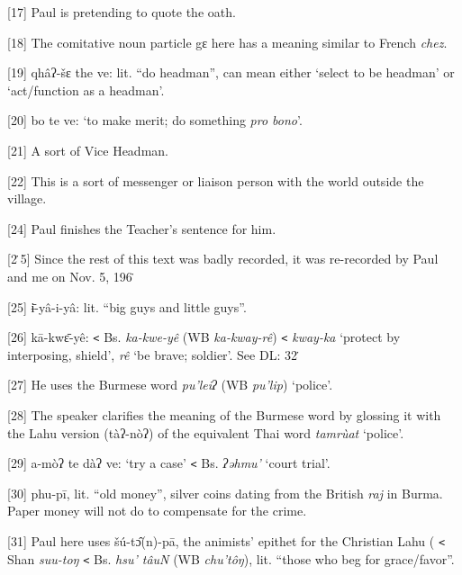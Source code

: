 {[17] Paul is pretending to quote the oath.}

{[18] The comitative noun particle gɛ here has a meaning similar to French
}{\textit{chez}}{.}

{[19] qhâʔ-šɛ the ve: lit. ``do headman'', can mean either `select to
be headman' or `act/function as a headman'. }

{[20] bo te ve: `to make merit; do something }{\textit{pro bono}}{'.}

{[21] A sort of Vice Headman.}

{[22] This is a sort of messenger or liaison person with the world outside
the village.}

{[24] Paul finishes the Teacher's sentence for him.}

{[2\.5] Since the rest of this text was badly recorded, it was re-recorded
by Paul and me on Nov. 5, 196\.}

{[25] ɨ̄-yâ-i-yâ: lit. ``big guys and little guys''.}

{[26] kā-kwɛ̄-yê: \texttt{<} Bs. }{\textit{ka-kwe-yê }}{(WB
}{\textit{ka-kway-rê}}{) \texttt{<} }{\textit{kway-ka}}{
`protect by interposing, shield', }{\textit{rê }}{`be brave; soldier'.
See DL: 32\.}

{[27] He uses the Burmese word }{\textit{pu'leiʔ }}{(WB }{\textit{pu'lip}}{)
`police'.}

{[28] The speaker clarifies the meaning of the Burmese word by glossing
it with the Lahu version (tàʔ-nòʔ) of the equivalent Thai word }{\textit{tamrùat
}}{`police'.}

{[29] a-mòʔ te dàʔ ve: `try a case' \texttt{<} Bs. }{\textit{ʔəhmu'
}}{`court trial'.}

{[30] phu-pī, lit. ``old money'', silver coins dating from the British
}{\textit{raj}}{ in Burma. Paper money will not do to compensate
for the crime.}

{[31] Paul here uses šú-tɔ̂(n)-pā, the animists' epithet for the Christian
Lahu ( \texttt{<} Shan }{\textit{suu-toŋ}}{ \texttt{<} Bs. }{\textit{hsu'
tâuN}}{ (WB }{\textit{chu'tôŋ}}{), lit. ``those who beg
for grace/favor''.}


